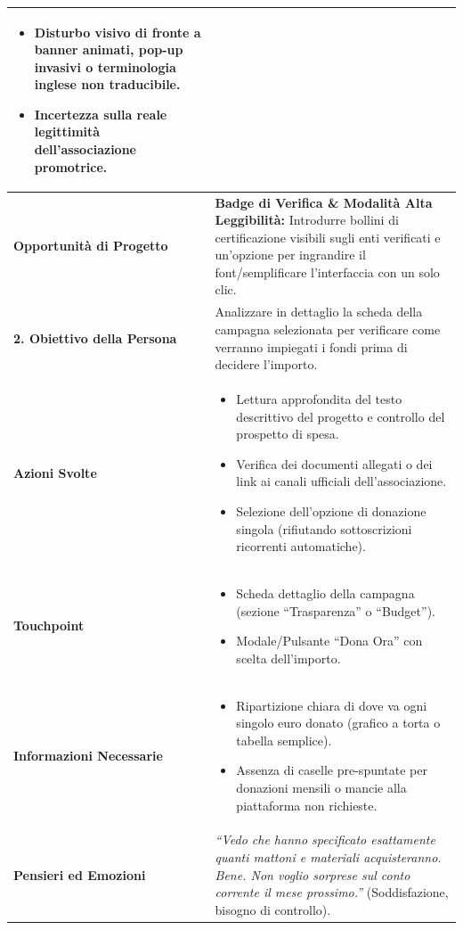 \documentclass[11pt,a4paper]{article}
\begin{document}
\begin{table}[h!]
\begin{tabular}{|p{3.2cm}|p{11.8cm}|}
\begin{itemize}[leftmargin=*,nosep]
    \item Disturbo visivo di fronte a banner animati, pop-up invasivi o terminologia inglese non traducibile.
    \item Incertezza sulla reale legittimità dell'associazione promotrice.
\end{itemize} \\ \hline
\textbf{Opportunità di Progetto} &
\textbf{Badge di Verifica \& Modalità Alta Leggibilità:} Introdurre bollini di certificazione visibili sugli enti verificati e un'opzione per ingrandire il font/semplificare l'interfaccia con un solo clic. \\ \hline
\hline
\textbf{2. Obiettivo della Persona} & Analizzare in dettaglio la scheda della campagna selezionata per verificare come verranno impiegati i fondi prima di decidere l'importo. \\ \hline
\textbf{Azioni Svolte} &
\begin{itemize}[leftmargin=*,nosep]
    \item Lettura approfondita del testo descrittivo del progetto e controllo del prospetto di spesa.
    \item Verifica dei documenti allegati o dei link ai canali ufficiali dell'associazione.
    \item Selezione dell'opzione di donazione singola (rifiutando sottoscrizioni ricorrenti automatiche).
\end{itemize} \\ \hline
\textbf{Touchpoint} &
\begin{itemize}[leftmargin=*,nosep]
    \item Scheda dettaglio della campagna (sezione ``Trasparenza'' o ``Budget'').
    \item Modale/Pulsante ``Dona Ora'' con scelta dell'importo.
\end{itemize} \\ \hline
\textbf{Informazioni Necessarie} &
\begin{itemize}[leftmargin=*,nosep]
    \item Ripartizione chiara di dove va ogni singolo euro donato (grafico a torta o tabella semplice).
    \item Assenza di caselle pre-spuntate per donazioni mensili o mancie alla piattaforma non richieste.
\end{itemize} \\ \hline
\textbf{Pensieri ed Emozioni} &
\textit{``Vedo che hanno specificato esattamente quanti mattoni e materiali acquisteranno. Bene. Non voglio sorprese sul conto corrente il mese prossimo.''} (Soddisfazione, bisogno di controllo). \\ \hline

\end{tabular}
\end{table}
\end{document}
